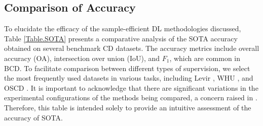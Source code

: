\begin{table*}[!ht]
    \centering
    \caption{Statistical overview of the benchmark CD datasets presented in Table \ref{Table.SOTA}.}\label{Table.Datasets}
\end{table*}

\subsection{Comparison of Accuracy}  \label{sc3-e}

To elucidate the efficacy of the sample-efficient DL methodologies discussed, Table \ref{Table.SOTA} presents a comparative analysis of the SOTA accuracy obtained on several benchmark CD datasets. The accuracy metrics include overall accuracy (OA), intersection over union (IoU), and $F_1$, which are common in BCD. To facilitate comparison between different types of supervision, we select the most frequently used datasets in various tasks, including Levir \cite{Chen2020}, WHU \cite{ji2018fully}, and OSCD \cite{daudt2018urban}. It is important to acknowledge that there are significant variations in the experimental configurations of the methods being compared, a concern raised in \cite{corley2024change}. Therefore, this table is intended solely to provide an intuitive assessment of the accuracy of SOTA.

